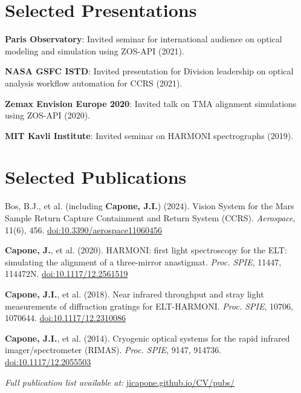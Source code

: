 \documentclass[letterpaper,11pt]{article}
\begin{document}
\section{Selected Presentations}
 \begin{itemize}[leftmargin=0.15in, label={}, noitemsep, topsep=0pt]
    \small{
        \item{\textbf{Paris Observatory}{: Invited seminar for international audience on optical modeling and simulation using ZOS-API (2021).}}
        \item{\textbf{NASA GSFC ISTD}{: Invited presentation for Division leadership on optical analysis workflow automation for CCRS (2021).}} \\
        \item{\textbf{Zemax Envision Europe 2020}{: Invited talk on TMA alignment simulations using ZOS-API (2020).}}\\
        \item{\textbf{MIT Kavli Institute}{: Invited seminar on HARMONI spectrographs (2019).}}\\
    }
 \end{itemize}

\section{Selected Publications}
\begin{itemize}[leftmargin=0.15in, label={}, noitemsep, topsep=0pt]
    \small{
        \item{Bos, B.J., et al. (including \textbf{Capone, J.I.}) (2024). Vision System for the Mars Sample Return Capture Containment and Return System (CCRS). \textit{Aerospace}, 11(6), 456. \href{https://doi.org/10.3390/aerospace11060456}{doi:10.3390/aerospace11060456}}
        \item{\textbf{Capone, J.}, et al. (2020). HARMONI: first light spectroscopy for the ELT: simulating the alignment of a three-mirror anastigmat. \textit{Proc. SPIE}, 11447, 114472N. \href{https://doi.org/10.1117/12.2561519}{doi:10.1117/12.2561519}}
        \item{\textbf{Capone, J.I.}, et al. (2018). Near infrared throughput and stray light measurements of diffraction gratings for ELT-HARMONI. \textit{Proc. SPIE}, 10706, 1070644. \href{https://doi.org/10.1117/12.2310086}{doi:10.1117/12.2310086}}
        \item{\textbf{Capone, J.I.}, et al. (2014). Cryogenic optical systems for the rapid infrared imager/spectrometer (RIMAS). \textit{Proc. SPIE}, 9147, 914736. \href{https://doi.org/10.1117/12.2055503}{doi:10.1117/12.2055503}}
        \item{\textit{Full publication list available at:} \href{https://jicapone.github.io/CV/pubs/}{jicapone.github.io/CV/pubs/}}
    }
\end{itemize}

\end{document}
